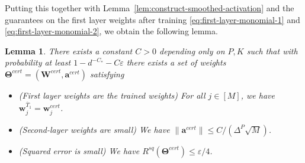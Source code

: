 \documentclass[11pt]{article}
\newcommand{\eps}{\varepsilon}
\newcommand{\<}{\langle}
\renewcommand{\>}{\rangle}
\newtheorem{lemma}{Lemma}
\theoremstyle{definition}
\def\bW{{\boldsymbol W}}
\def\ba{{\boldsymbol a}}
\def\bw{{\boldsymbol w}}
\def\bTheta{{\boldsymbol \Theta}}
\def\bTheta{{\boldsymbol \Theta}}
\def\bw{{\boldsymbol w}}
\def\bW{{\boldsymbol W}}
\def\ba{{\boldsymbol a}}
\def\bTheta{{\boldsymbol \Theta}}
\def\eps{\varepsilon}
\def\oT{\overline{T}}
\begin{document}
Putting this together with Lemma~\ref{lem:construct-smoothed-activation} and the guarantees on the first layer weights after training \eqref{eq:first-layer-monomial-1} and \eqref{eq:first-layer-monomial-2}, we obtain the following lemma.
\begin{lemma} \label{lem:certificate-formal-monomial} There exists a constant $C > 0$ depending only on $P,K$ such that with probability at least $1 - d^{-C_*} - C\eps$ there exists a set of weights $\bTheta^{cert} = (\bW^{cert}, \ba^{cert})$ satisfying
\begin{itemize}
\item (First layer weights are the trained weights) For all $j \in [M]$, we have $\bw_j^{\oT_1} = \bw^{cert}_j$.
\item (Second-layer weights are small) We have $\|\ba^{cert}\| \leq C / (\Delta^P \sqrt{M})$.
\item (Squared error is small) We have $R^{sq}(\bTheta^{cert}) \leq \eps / 4$.
\end{itemize}
\end{lemma}
\end{document}

